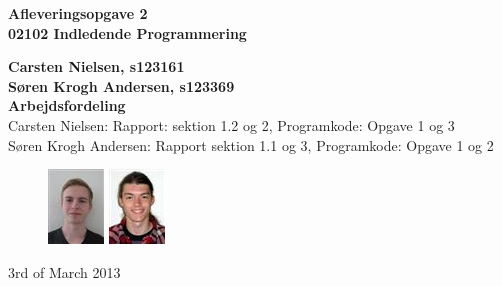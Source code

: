 \thispagestyle{empty} %
\hspace{6cm} \vspace{3cm}
\begin{center}
\textbf{\Huge {Afleveringsopgave 2}\\ \vspace{1cm}
\huge{02102 Indledende Programmering}}
\end{center}
\vspace{1cm}
\begin{center}
\Large{\textbf{Carsten Nielsen, s123161 \\ Søren Krogh Andersen, s123369}} \\
\vspace{1cm}
\Large{\textbf{Arbejdsfordeling}} \\
Carsten Nielsen: Rapport: sektion 1.2 og 2, Programkode: Opgave 1 og 3 \\
Søren Krogh Andersen: Rapport sektion 1.1 og 3, Programkode: Opgave 1 og 2
\end{center}
\vspace{6cm}
\begin{figure}[h]
\hfill
\includegraphics{s123161.png}%
\includegraphics{s123369.png}%
\end{figure}
3rd of March 2013

\thispagestyle{empty}
